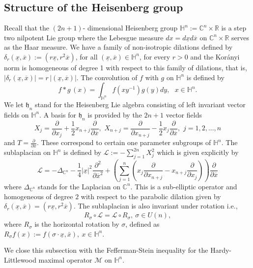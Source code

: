 \documentclass[11pt]{amsart}
\newcommand {\C}{\mathbb C}
\newcommand{\Ha}{\mathbb{H}^n}
\theoremstyle{definition}
\numberwithin{equation}{section}
\begin{document}
\subsection{Structure of the Heisenberg group}	Recall that the $(2n+1)$- dimensional Heisenberg group $\mathbb{H}^n:=\mathbb{C}^n\times\mathbb{R}$ is a step two nilpotent Lie group where the Lebesgue measure $dx=d\underline{x}d\overline{x}$ on $\mathbb{C}^n\times\mathbb{R}$ serves as the Haar measure. We have a family of non-isotropic dilations defined by $\delta_{r}(\underline{x}, \overline{x}):=(r \underline{x}, r^2 \overline{x})$, for all $(\underline{x}, \overline{x}) \in \mathbb{H}^n$, for every $r>0$ and the Kor\'anyi norm is homogeneous of degree 1 with respect to this family of dilations, that is, $|\delta_{r}(\underline{x}, \overline{x})|= r \,  |(\underline{x}, \overline{x})|$. The convolution of $f$ with $g$ on $\Ha$ is defined by
\begin{equation*}
   f * g \, (x) = \int_{\Ha}  f(x y^{-1}) g(y) dy, \ \ \ x \in \Ha.
\end{equation*}
    We let $ \mathfrak{h}_n $ stand for the Heisenberg Lie algebra consisting of left invariant vector fields on $ \mathbb{H}^n .$  A  basis for $ \mathfrak{h}_n $ is provided by the $ 2n+1 $ vector fields
	 $$ X_j = \frac{\partial}{\partial{x_j}}+\frac{1}{2} x_{n+j} \frac{\partial}{\partial \overline{x}}, \,\,X_{n+j} = \frac{\partial}{\partial{x_{n+j}}}-\frac{1}{2} x_j \frac{\partial}{\partial \overline{x}}, \,\, j = 1,2,..., n $$
	 and $ T = \frac{\partial}{\partial \overline{x}}.$  These correspond to certain one parameter subgroups of $ \mathbb{H}^n.$ The sublaplacian on $\Ha$ is defined by $\mathcal{L}:=-\sum_{j=1}^{2n}X_j^2 $ which is given explicitly by
	 $$\mathcal{L}=-\Delta_{\C^n}-\frac{1}{4}|\underline{x}|^2\frac{\partial^2}{\partial \overline{x}^2}+\left(\sum_{j=1}^{n}\left(x_j\frac{\partial}{\partial x_{n+j}}-x_{n+j}\frac{\partial}{\partial x_j}\right)\right)\frac{\partial}{\partial \overline{x}}$$ where  $\Delta_{\C^n}$ stands for the Laplacian on $\C^n.$ 
	 This is a sub-elliptic operator and homogeneous of degree $2$ with respect to the parabolic dilation given by $\delta_{r}(\underline{x}, \overline{x})=(r \underline{x}, r^2 \overline{x}).$ The sublaplacian is also invariant under  rotation i.e., $$R_{\sigma}\circ \mathcal{L}=\mathcal{L}\circ R_{\sigma},~\sigma\in U(n),$$
     where $R_\sigma$ is the horizontal rotation by $\sigma$,  defined as $R_\sigma f(x):=f(\sigma \cdot \underline{x}, \bar{x}),~x\in \Ha.$

     
We close this subsection with the Fefferman-Stein inequality for the Hardy-Littlewood maximal operator $\mathcal{M}$ on  $\Ha.$ 
\end{document}
